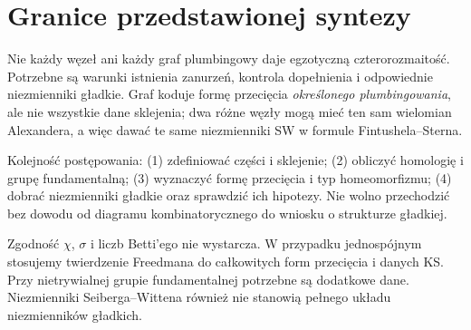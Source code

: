 \begin{center}
\end{center}

\section{Granice przedstawionej syntezy}
\label{sec:tg-syn-limits}

Nie każdy węzeł ani każdy graf plumbingowy daje egzotyczną
czterorozmaitość. Potrzebne są warunki istnienia zanurzeń,
kontrola dopełnienia i odpowiednie niezmienniki gładkie.
Graf koduje formę przecięcia \emph{określonego plumbingowania},
ale nie wszystkie dane sklejenia; dwa różne węzły mogą
mieć ten sam wielomian Alexandera, a więc dawać te same
niezmienniki SW w formule Fintushela--Sterna.

\begin{uwaga}
Kolejność postępowania: (1) zdefiniować części i sklejenie;
(2) obliczyć homologię i grupę fundamentalną;
(3) wyznaczyć formę przecięcia i typ homeomorfizmu;
(4) dobrać niezmienniki gładkie oraz sprawdzić ich hipotezy.
Nie wolno przechodzić bez dowodu od diagramu
kombinatorycznego do wniosku o strukturze gładkiej.
\end{uwaga}


\begin{uwaga}
Zgodność $\chi$, $\sigma$ i liczb Betti'ego nie wystarcza.
W przypadku jednospójnym stosujemy twierdzenie Freedmana
do całkowitych form przecięcia i danych KS.
Przy nietrywialnej grupie fundamentalnej potrzebne są
dodatkowe dane. Niezmienniki Seiberga--Wittena również
nie stanowią pełnego układu niezmienników gładkich.
\end{uwaga}

